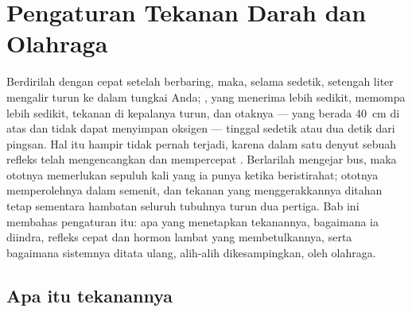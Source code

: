 \chapter{Pengaturan Tekanan Darah dan Olahraga}\label{ch:b2:blood-pressure}

Berdirilah dengan cepat setelah berbaring, maka, selama sedetik,
setengah liter  mengalir turun ke dalam  tungkai Anda;
, yang menerima lebih sedikit, memompa lebih sedikit,
tekanan di kepalanya turun, dan otaknya --- yang berada \qty{40}{cm} di
atas  dan tidak dapat menyimpan oksigen --- tinggal sedetik
atau dua detik dari pingsan. Hal itu hampir tidak pernah terjadi,
karena dalam satu denyut sebuah refleks telah mengencangkan 
dan mempercepat . Berlarilah mengejar bus, maka ototnya
memerlukan sepuluh kali  yang ia punya ketika beristirahat;
ototnya memperolehnya dalam semenit, dan tekanan yang
menggerakkannya ditahan tetap sementara hambatan seluruh tubuhnya turun
dua pertiga. Bab ini membahas pengaturan itu: apa yang menetapkan
tekanannya, bagaimana ia diindra, refleks cepat dan hormon lambat yang
membetulkannya, serta bagaimana sistemnya ditata ulang, alih-alih
dikesampingkan, oleh olahraga.

\section{Apa itu tekanannya}

